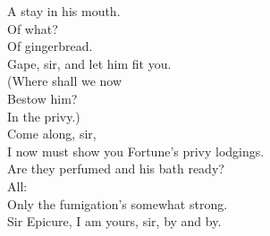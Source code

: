\documentclass[a4paper,oneside,12pt]{memoir}
\begin{document}
\begin{drama*}
A stay in his mouth.\\
\subtlespeaks {} Of what?\\
\facespeaks {} Of gingerbread.\\
Gape, sir, and let him fit you.\\
\subtlespeaks {} (Where shall we now\\
Bestow him?\\
\dolspeaks {} In the privy.)\\
\subtlespeaks {} Come along, sir,\\
I now must show you Fortune's privy lodgings.\\
\facespeaks Are they perfumed and his bath ready?\\
\subtlespeaks {} All:\\
Only the fumigation's somewhat strong.\\
\facespeaks {}
Sir Epicure, I am yours, sir, by and by.\\

\scene


\end{drama*}
\end{document}
